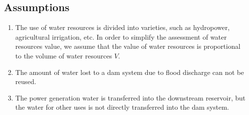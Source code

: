 \documentclass{mcmthesis}
\begin{document}
\subsection{Assumptions}
\begin{enumerate}
  \item The use of water resources is divided into varieties, such as hydropower, agricultural irrigation, etc. In order to simplify the assessment of water resources value, we assume that the value of water resources is proportional to the volume of water resources $V$. 
  \item The amount of water lost to a dam system due to flood discharge can not be reused.
  \item The power generation water is transferred into the downstream reservoir, but the water for other uses is not directly transferred into the dam system.
\end{enumerate}
\end{document}
